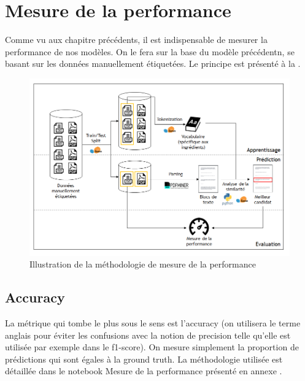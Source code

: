         {\renewcommand{\arraystretch}{1.5}%
        \begin{spacing}{1.0}
        \begin{center}
            {\scriptsize
            
            }
        \end{center}
        \end{spacing}
        }

    \chapter{Mesure de la performance}
    \label{performance}
    
    Comme vu aux chapitre précédents, il est indispensable de mesurer la performance de nos modèles.
    On le fera sur la base du modèle précédentn, se basant sur les données manuellement étiquetées.
    Le principe est présenté à la .

    \begin{figure}[htbp]
        \begin{center}
        \includegraphics[width=0.9\linewidth]{img/measured_model.png}
        \end{center}
        \caption{Illustration de la méthodologie de mesure de la performance}
        \label{fig:measured_model}
    \end{figure}     

        \section{Accuracy}
        
        La métrique qui tombe le plus sous le sens est l'accuracy (on utilisera le terme anglais pour éviter les confusions avec la notion de \og precision \fg telle qu'elle est utilisée par exemple dans le f1-score).
        On mesure simplement la proportion de prédictions qui sont égales à la ground truth.
        La méthodologie utilisée est détaillée dans le notebook \og Mesure de la performance \fg présenté en annexe .

